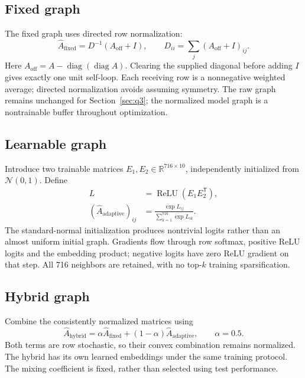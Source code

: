 \documentclass[11pt,a4paper]{article}
\begin{document}
\subsection{Fixed graph}

The fixed graph uses directed row normalization:
\begin{equation}\label{eq:fixed}
\widehat A_{\mathrm{fixed}}=D^{-1}(A_{\mathrm{off}}+I),\qquad D_{ii}=\sum_j(A_{\mathrm{off}}+I)_{ij}.
\end{equation}
Here \(A_{\mathrm{off}}=A-\operatorname{diag}(\operatorname{diag}A)\). Clearing the supplied diagonal before adding \(I\) gives exactly one unit self-loop. Each receiving row is a nonnegative weighted average; directed normalization avoids assuming symmetry. The raw graph remains unchanged for Section~\ref{sec:q3}; the normalized model graph is a nontrainable buffer throughout optimization.


\subsection{Learnable graph}

Introduce two trainable matrices \(E_1,E_2\in\mathbb R^{716\times10}\), independently initialized from \(\mathcal N(0,1)\). Define
\begin{align}
L&=\operatorname{ReLU}(E_1E_2^{\mathsf T}),\\
(\widehat A_{\mathrm{adaptive}})_{ij}&=\frac{\exp L_{ij}}{\sum_{k=1}^{716}\exp L_{ik}}.
\end{align}
The standard-normal initialization produces nontrivial logits rather than an almost uniform initial graph. Gradients flow through row softmax, positive ReLU logits and the embedding product; negative logits have zero ReLU gradient on that step. All 716 neighbors are retained, with no top-\(k\) training sparsification.


\subsection{Hybrid graph}

Combine the consistently normalized matrices using
\begin{equation}\label{eq:hybrid}
\widehat A_{\mathrm{hybrid}}=\alpha\widehat A_{\mathrm{fixed}}+(1-\alpha)\widehat A_{\mathrm{adaptive}},\qquad\alpha=0.5.
\end{equation}
Both terms are row stochastic, so their convex combination remains normalized. The hybrid has its own learned embeddings under the same training protocol. The mixing coefficient is fixed, rather than selected using test performance.
\end{document}
